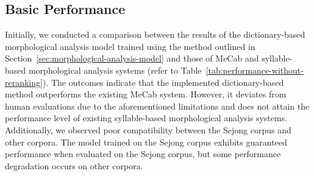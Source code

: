 \documentclass[AMS,STIX2COL]{WileyNJD-v2}
\begin{document}
    \subsection{Basic Performance}\label{subsec:basic-performance}

    Initially, we conducted a comparison between the results of the dictionary-based morphological analysis model trained using the method outlined in Section~\ref{sec:morphological-analysis-model} and those of MeCab and syllable-based morphological analysis systems (refer to Table~\ref{tab:performance-without-reranking}).
    The outcomes indicate that the implemented dictionary-based method outperforms the existing MeCab system.
    However, it deviates from human evaluations due to the aforementioned limitations and does not attain the performance level of existing syllable-based morphological analysis systems.
    Additionally, we observed poor compatibility between the Sejong corpus and other corpora.
    The model trained on the Sejong corpus exhibits guaranteed performance when evaluated on the Sejong corpus, but some performance degradation occurs on other corpora.
\end{document}
